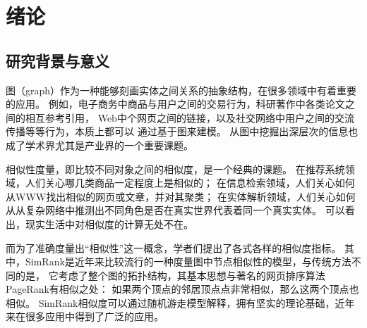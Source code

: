 \documentclass[master]{njuthesis}
\begin{document}
%

\tableofcontents



\mainmatter

\chapter{绪论}\label{chapter_introduction}
\section{研究背景与意义}
图（graph）作为一种能够刻画实体之间关系的抽象结构，在很多领域中有着重要的应用。
例如，电子商务中商品与用户之间的交易行为，科研著作中各类论文之间的相互参考引用，
Web中个网页之间的链接，以及社交网络中用户之间的交流传播等等行为，本质上都可以
通过基于图来建模。 从图中挖掘出深层次的信息也成了学术界尤其是产业界的一个重要课题。

相似性度量，即比较不同对象之间的相似度，是一个经典的课题。
在推荐系统\cite{fouss2007random}领域，人们关心哪几类商品一定程度上是相似的；
在信息检索\cite{dean1999finding}领域，人们关心如何从WWW找出相似的网页或文章，并对其聚类；
在实体解析\cite{bhattacharya2006entity}领域，人们关心如何从从复杂网络中推测出不同角色是否在真实世界代表着同一个真实实体。
可以看出，现实生活中对相似度的计算无处不在。

而为了准确度量出“相似性”这一概念，学者们提出了各式各样的相似度指标。
其中，SimRank\cite{jeh2002simrank}是近年来比较流行的一种度量图中节点相似性的模型，与传统方法不同的是，
它考虑了整个图的拓扑结构，其基本思想与著名的网页排序算法PageRank\cite{page1999pagerank}有相似之处：
如果两个顶点的邻居顶点点非常相似，那么这两个顶点也相似。
SimRank相似度可以通过随机游走模型解释，拥有坚实的理论基础，近年来在很多应用中得到了广泛的应用。
\end{document}
